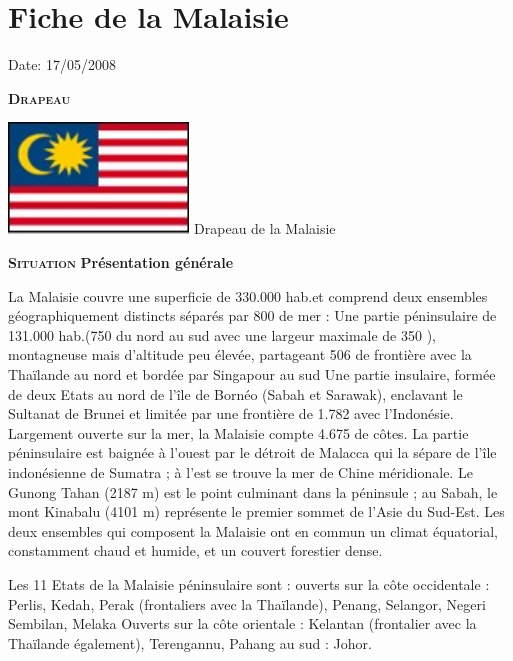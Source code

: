 \section{Fiche de la Malaisie}

Date: 17/05/2008

\begin{multicols}{2}

\textbf{\textsc{Drapeau}}

\hspace*{-0.65cm}
\includegraphics[width=4.8cm]{articles/Fiche-de-la-malaisie/1210328778gbyq.jpg}
Drapeau de la Malaisie


\textbf{\textsc{Situation}}
\textbf{Présentation générale}

La Malaisie couvre une superficie de 330.000 hab.\kilo\meter\squared et comprend deux ensembles géographiquement distincts séparés par 800 \kilo\meter de mer :  Une partie péninsulaire de 131.000 hab.\kilo\meter\squared (750 \kilo\meter du nord au sud avec une largeur maximale de 350 \kilo\meter), montagneuse mais d'altitude peu élevée, partageant 506 \kilo\meter de frontière avec la Thaïlande au nord et bordée par Singapour au sud
Une partie insulaire, formée de deux Etats au nord de l'île de Bornéo (Sabah et Sarawak), enclavant le Sultanat de Brunei et limitée par une frontière de 1.782 \kilo\meter avec l'Indonésie. Largement ouverte sur la mer, la Malaisie compte 4.675 \kilo\meter de côtes. La partie péninsulaire est baignée à l'ouest par le détroit de Malacca qui la sépare de l'île indonésienne de Sumatra ; à l'est se trouve la mer de Chine méridionale. Le Gunong Tahan (2187 m) est le point culminant dans la péninsule ; au Sabah, le mont Kinabalu (4101 m) représente le premier sommet de l'Asie du Sud-Est. Les deux ensembles qui composent la Malaisie ont en commun un climat équatorial, constamment chaud et humide, et un couvert forestier dense.

Les 11 Etats de la Malaisie péninsulaire sont :  ouverts sur la côte occidentale : Perlis, Kedah, Perak (frontaliers avec la Thaïlande), Penang, Selangor, Negeri Sembilan, Melaka Ouverts sur la côte orientale : Kelantan (frontalier avec la Thaïlande également), Terengannu, Pahang au sud : Johor.


\end{multicols}
